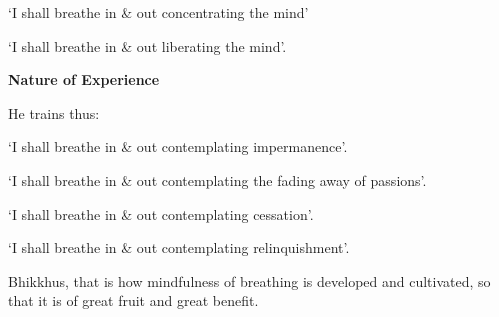 {`I shall breathe in \& out concentrating the mind'

`I shall breathe in \& out liberating the mind'.

\textbf{Nature of Experience}

He trains thus:

`I shall breathe in \& out contemplating impermanence'.

`I shall breathe in \& out contemplating the fading away of passions'.

`I shall breathe in \& out contemplating cessation'.

`I shall breathe in \& out contemplating relinquishment'.

\bigskip

Bhikkhus, that is how mindfulness of breathing is developed and cultivated, so that it is of great fruit and great benefit.

}
